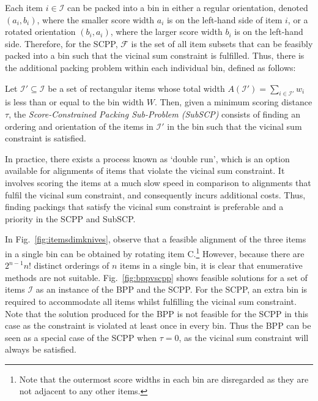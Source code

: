 \documentclass[a4paper,11pt,authoryear]{elsarticle}
\begin{document}
\noindent Each item $i \in \mathcal{I}$ can be packed into a bin in either a regular orientation, denoted $(a_i, b_i)$, where the smaller score width $a_i$ is on the left-hand side of item $i$, or a rotated orientation $(b_i, a_i)$, where the larger score width $b_i$ is on the left-hand side. Therefore, for the SCPP, $\mathcal{F}$ is the set of all item subsets that can be feasibly packed into a bin such that the vicinal sum constraint is fulfilled. Thus, there is the additional packing problem within each individual bin, defined as follows:

\begin{definition}
	Let $\mathcal{I}' \subseteq \mathcal{I}$ be a set of rectangular items whose total width $A(\mathcal{I}') = \sum_{i \in \mathcal{I}'} w_i$ is less than or equal to the bin width $W$. Then, given a minimum scoring distance $\tau$, the \emph{Score-Constrained Packing Sub-Problem (SubSCP)} consists of finding an ordering and orientation of the items in $\mathcal{I}'$ in the bin such that the vicinal sum constraint is satisfied.
	\label{defn:subscp}
\end{definition}

\noindent In practice, there exists a process known as `double run', which is an option available for alignments of items that violate the vicinal sum constraint. It involves scoring the items at a much slow speed in comparison to alignments that fulfil the vicinal sum constraint, and consequently incurs additional costs. Thus, finding packings that satisfy the vicinal sum constraint is preferable and a priority in the SCPP and SubSCP.

In Fig.~\ref{fig:itemsdimknives}, observe that a feasible alignment of the three items in a single bin can be obtained by rotating item C.\footnote{Note that the outermost score widths in each bin are disregarded as they are not adjacent to any other items.} However, because there are $2^{n-1} n!$ distinct orderings of $n$ items in a single bin, it is clear that enumerative methods are not suitable. Fig.~\ref{fig:bppvscpp} shows feasible solutions for a set of items $\mathcal{I}$ as an instance of the BPP and the SCPP. For the SCPP, an extra bin is required to accommodate all items whilst fulfilling the vicinal sum constraint. Note that the solution produced for the BPP is not feasible for the SCPP in this case as the constraint is violated at least once in every bin. Thus the BPP can be seen as a special case of the SCPP when $\tau=0$, as the vicinal sum constraint will always be satisfied.
\end{document}
